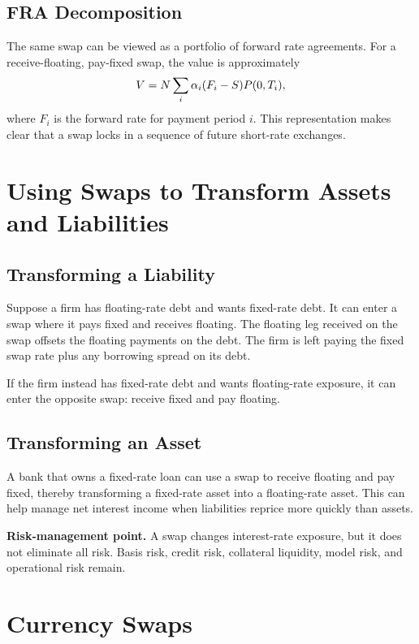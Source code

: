 \subsection{FRA Decomposition}

The same swap can be viewed as a portfolio of forward rate agreements. For a
receive-floating, pay-fixed swap, the value is approximately
\[
    V
    =
    N\sum_i \alpha_i (F_i-S)P(0,T_i),
\]
where $F_i$ is the forward rate for payment period $i$. This representation
makes clear that a swap locks in a sequence of future short-rate exchanges.

\section{Using Swaps to Transform Assets and Liabilities}

\subsection{Transforming a Liability}

Suppose a firm has floating-rate debt and wants fixed-rate debt. It can enter a
swap where it pays fixed and receives floating. The floating leg received on the
swap offsets the floating payments on the debt. The firm is left paying the
fixed swap rate plus any borrowing spread on its debt.

If the firm instead has fixed-rate debt and wants floating-rate exposure, it can
enter the opposite swap: receive fixed and pay floating.

\subsection{Transforming an Asset}

A bank that owns a fixed-rate loan can use a swap to receive floating and pay
fixed, thereby transforming a fixed-rate asset into a floating-rate asset. This
can help manage net interest income when liabilities reprice more quickly than
assets.

\begin{boxF}
\textbf{Risk-management point.} A swap changes interest-rate exposure, but it
does not eliminate all risk. Basis risk, credit risk, collateral liquidity,
model risk, and operational risk remain.
\end{boxF}

\section{Currency Swaps}

